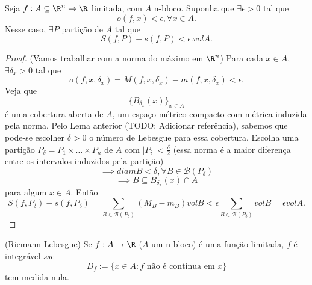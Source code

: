\begin{lemma}
    Seja $f:A\subseteq\R^{n}\to \R$ limitada, com $A$ n-bloco. Suponha que $\exists \epsilon>0$ tal que \[
    o\left( f, x \right) < \epsilon, \forall x\in A
    .\] Nesse caso, $\exists P$ partição de $A$ tal que \[
    S\left( f,P \right) -s\left( f, P \right) < \epsilon . vol A
    .\] 
\end{lemma}
\begin{proof}
    (Vamos trabalhar com a norma do máximo em $\R^{n}$)
    Para cada $x\in A$, $\exists \delta_x > 0$ tal que \[
    o\left( f, x, \delta_x \right) = M\left( f,x,\delta_x \right) -m\left( f,x,\delta_x \right) < \epsilon
.\] Veja que \[
\{B_{\delta_x}\left( x \right) \} _{x\in A}
\] é uma cobertura aberta de $A$, um espaço métrico compacto com métrica induzida pela norma.
Pelo Lema anterior (TODO: Adicionar referência), sabemos que pode-se escolher $\delta > 0$ o número de Lebesgue para essa cobertura. Escolha uma partição $P_\delta=P_1\times \ldots\times P_n$ de $A$ com $\left| P_i \right| < \frac{\delta}{2}$ (essa norma é a maior diferença entre os intervalos induzidos pela partição) \[
\implies diam B < \delta, \forall B\in \mathcal{B}\left( P_\delta \right) 
\] \[
\implies B\subseteq B_{\delta_x}\left( x \right) \cap A
\] para algum $x\in A$.
Então \[
S\left( f,P_\delta \right) - s\left( f, P_\delta \right) = \sum_{B\in \mathcal{B}\left( P_\delta \right) } \left( M_B - m_B \right) vol B < \epsilon \sum_{B\in \mathcal{B}\left( P_\delta \right) } vol B = \epsilon vol A
.\] 
\end{proof}

\begin{theorem}
    (Riemann-Lebesgue) Se $f:A\to \R$ ($A$ um n-bloco) é uma função limitada, $f$ é integrável \emph{sse} \[
    D_f := \{x\in A: f\text{ não é contínua em }x\} 
    \] tem medida nula.
\end{theorem}

